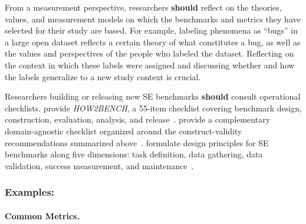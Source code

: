 \documentclass[smallextended]{svjour3}
\newcommand{\should}{\textbf{should}\xspace}
\newcommand{\guidelinesubsubsection}[1]{\subsubsection{\bfseries #1:}}
\newcommand{\guidelineparagraph}[1]{\paragraph{#1.}}
\newcommand{\guidelinesubsubsection}[1]{\subsubsection{#1}}
\newcommand{\guidelineparagraph}[1]{\paragraph{#1}}
\begin{document}
From a measurement perspective, researchers \should reflect on the theories, values, and measurement models on which the benchmarks and metrics they have selected for their study are based.
For example, labeling phenomena as ``bugs'' in a large open dataset reflects a certain theory of what constitutes a bug, as well as the values and perspectives of the people who labeled the dataset. Reflecting on the context in which these labels were assigned and discussing whether and how the labels generalize to a new study context is crucial.

Researchers building or releasing new SE benchmarks \should consult operational checklists. \citeauthor{cao2025should} provide \emph{HOW2BENCH}, a 55-item checklist covering benchmark design, construction, evaluation, analysis, and release~\cite{cao2025should}. \citeauthor{bean2025measuring} provide a complementary domain-agnostic checklist organized around the construct-validity recommendations summarized above~\cite{bean2025measuring}. \citeauthor{Izadi2026benchmarking} formulate design principles for SE benchmarks along five dimensions: task definition, data gathering, data validation, success measurement, and maintenance~\cite{Izadi2026benchmarking}.

\guidelinesubsubsection{Examples}

\guidelineparagraph{Common Metrics}
\end{document}
